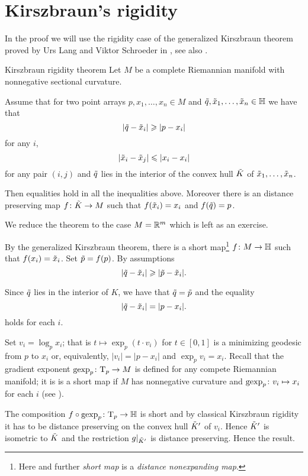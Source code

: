 \section{Kirszbraun's rigidity}

In the proof we will use the rigidity case of the generalized Kirszbraun theorem proved by Urs Lang and Viktor Schroeder in \cite{LS}, see also \cite{AKP}.

\begin{thm}{Kirszbraun rigidity theorem}\label{thm:kirszbraun-rigid}
Let $M$ be a complete Riemannian manifold with nonnegative sectional curvature.

Assume that for two point arrays $p,x_1,\dots,x_n\in M$ and $\~q, \~x_1,\dots,\~x_n\in \HH$ we have that 
\[|\~q-\~x_i|\ge |p-x_i|\]
for any $i$,
\[|\~x_i-\~x_j|\le |x_i-x_i|\]
for any pair $(i,j)$
and $\~q$ lies in the interior of the convex hull $\~K$ of $\~x_1,\dots,\~x_n$.

Then equalities hold in all the inequalities above.
Moreover there is an distance preserving map $f\:\~K\to M$ such that $f(\~x_i)=x_i$ and $f(\~q)=p$. 
\end{thm}

We reduce the theorem to the case $M=\RR^m$ which is left as an exercise.

By the generalized Kirszbraun theorem, there is a short map\footnote{Here and further \emph{short map} is a \emph{distance nonexpanding map}.} $f\:M\to \HH$
such that $f(x_i)=\~x_i$.
Set  $\~p=f(p)$.
By assumptions
\[|\~q-\~x_i|\ge |\~p-\~x_i|.\]

Since $\~q$ lies in the interior of $K$, we have that $\~q=\~p$ and the equality 
\[|\~q-\~x_i|= |p-x_i|.\]
holds for each $i$.

Set $v_i=\log_px_i$; that is $t\mapsto \exp_p(t\cdot v_i)$ for $t\in[0,1]$ is a minimizing geodesic from $p$ to $x_i$ or, equivalently, $|v_i|=|p-x_i|$ and $\exp_pv_i=x_i$.
Recall that the gradient exponent $\gexp_p\:\T_p\to M$ is defined for any compete Riemannian manifold;
it is is a short map if $M$ has nonnegative curvature 
and $\gexp_p\:v_i\mapsto x_i$ for each $i$ (see \cite{AKP}).


The composition $f\circ \gexp_p\:\T_p\to \HH$ is short
and by classical Kirszbraun rigidity it has to be distance preserving on the convex hull $\~K'$ of $v_i$.
Hence $\~K'$ is isometric to $\~K$ and the restriction $g|_{\~K'}$ is distance preserving. 
Hence the result.
\qeds
